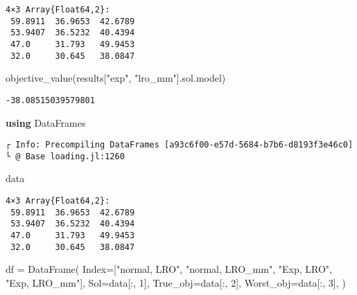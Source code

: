 \documentclass[
  10pt,
  a4paper,
,tablecaptionabove
]{scrartcl}
\newenvironment{Shaded}{}{}
\newcommand{\FloatTok}[1]{\textcolor[rgb]{0.25,0.63,0.44}{#1}}
\newcommand{\KeywordTok}[1]{\textcolor[rgb]{0.00,0.44,0.13}{\textbf{#1}}}
\newcommand{\NormalTok}[1]{#1}
\newcommand{\OperatorTok}[1]{\textcolor[rgb]{0.40,0.40,0.40}{#1}}
\newcommand{\StringTok}[1]{\textcolor[rgb]{0.25,0.44,0.63}{#1}}
\begin{document}
\begin{verbatim}
4×3 Array{Float64,2}:
 59.8911  36.9653  42.6789
 53.9407  36.5232  40.4394
 47.0     31.793   49.9453
 32.0     30.645   38.0847
\end{verbatim}

\begin{Shaded}
\begin{Highlighting}[]
\NormalTok{objective\_value(results[}\StringTok{"exp"}\OperatorTok{,} \StringTok{"lro\_mm"}\NormalTok{].sol.model)}
\end{Highlighting}
\end{Shaded}

\begin{verbatim}
-38.08515039579801
\end{verbatim}

\begin{Shaded}
\begin{Highlighting}[]
\KeywordTok{using}\NormalTok{ DataFrames}
\end{Highlighting}
\end{Shaded}

\begin{verbatim}
┌ Info: Precompiling DataFrames [a93c6f00-e57d-5684-b7b6-d8193f3e46c0]
└ @ Base loading.jl:1260
\end{verbatim}

\begin{Shaded}
\begin{Highlighting}[]
\NormalTok{data}
\end{Highlighting}
\end{Shaded}

\begin{verbatim}
4×3 Array{Float64,2}:
 59.8911  36.9653  42.6789
 53.9407  36.5232  40.4394
 47.0     31.793   49.9453
 32.0     30.645   38.0847
\end{verbatim}

\begin{Shaded}
\begin{Highlighting}[]
\NormalTok{df }\OperatorTok{=}\NormalTok{ DataFrame(}
\NormalTok{    Index}\OperatorTok{=}\NormalTok{[}\StringTok{"normal, LRO"}\OperatorTok{,} \StringTok{"normal, LRO\_mm"}\OperatorTok{,} \StringTok{"Exp, LRO"}\OperatorTok{,} \StringTok{"Exp, LRO\_mm"}\NormalTok{]}\OperatorTok{,} 
\NormalTok{    Sol}\OperatorTok{=}\NormalTok{data[}\OperatorTok{:,} \FloatTok{1}\NormalTok{]}\OperatorTok{,}
\NormalTok{    True\_obj}\OperatorTok{=}\NormalTok{data[}\OperatorTok{:,} \FloatTok{2}\NormalTok{]}\OperatorTok{,}
\NormalTok{    Worst\_obj}\OperatorTok{=}\NormalTok{data[}\OperatorTok{:,} \FloatTok{3}\NormalTok{]}\OperatorTok{,}
\NormalTok{)}
\end{Highlighting}
\end{Shaded}
\end{document}
